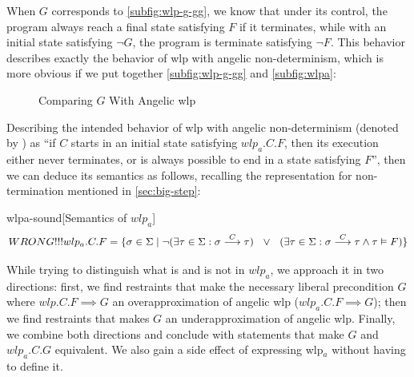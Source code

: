 When $G$ corresponds to \autoref{subfig:wlp-g-gg}, we know that under its control, the program always  reach a final state satisfying $F$ if it terminates, while with an initial state satisfying $\neg G$, the program is  terminate satisfying $\neg F$.
This behavior describes exactly the behavior of wlp with angelic non-determinism, which is more obvious if we put together \autoref{subfig:wlp-g-gg} and  \autoref{subfig:wlpa}: 
\begin{figure}[h!]
	\centering
	\hfill 
	
	\label{wlp-g-wlpa}
	\caption{Comparing $G$ With Angelic wlp}
\end{figure}


Describing the intended behavior of wlp with angelic non-determinism (denoted by ) as ``if $C$ starts in an initial state satisfying $wlp_a.C.F$, then its execution either never terminates, or is always possible to end in a state satisfying $F$'', then we can deduce its semantics as follows, recalling the representation for non-termination mentioned in \autoref{sec:big-step}: 
\begin{statement}{wlpa-sound}[Semantics of $wlp_a$]%
\ \vspace{-1.5mm}
\[
WRONG!!! wlp_a.C.F = \{ \sigma\in\S \mid
\neg(\exists \tau\in\S: \sigma\goto{C}\tau) \ \ \vee\ \ 
(\exists \tau\in\S: \sigma\goto{C}\tau\wedge  \tau\vDash F)
 \}
\]
\end{statement}

While trying to distinguish what is and is not in $wlp_a$, we approach it in two directions: first, we find restraints that make the necessary liberal precondition $G$ where $wlp.C.F\implies G$ an overapproximation of angelic wlp ($ wlp_a.C.F \implies G$); then we find restraints that makes $G$ an underapproximation of angelic wlp. 
Finally, we combine both directions and conclude with statements that make $G$ and $wlp_a.C.G$ equivalent. 
We also gain a side effect of expressing wlp$_a$ without having to define it. 

